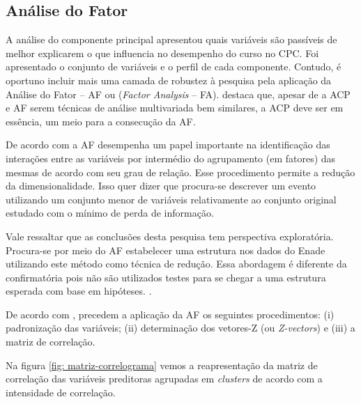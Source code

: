 \subsection{Análise do Fator}

A análise do componente principal apresentou quais variáveis são passíveis de melhor explicarem o que influencia no desempenho do curso no CPC. Foi apresentado o conjunto de variáveis e o perfil de cada componente. Contudo, é oportuno incluir mais uma camada de robustez à pesquisa pela aplicação da Análise do Fator -- AF ou (\textit{Factor Analysis} -- FA).  destaca que, apesar de a ACP e AF serem técnicas de análise multivariada bem similares, a ACP deve ser em essência, um meio para a consecução da AF. 

De acordo com  a AF desempenha um papel importante na identificação das interações entre as variáveis por intermédio do agrupamento (em fatores) das mesmas de acordo com seu grau de relação. Esse procedimento permite a redução da dimensionalidade. Isso quer dizer que procura-se descrever um evento utilizando um conjunto menor de variáveis relativamente ao conjunto original estudado com o mínimo de perda de informação.

Vale ressaltar que as conclusões desta pesquisa tem perspectiva exploratória. Procura-se por meio do AF estabelecer uma estrutura nos dados do Enade utilizando este método como técnica de redução. Essa abordagem é diferente da confirmatória pois não são utilizados testes para se chegar a uma estrutura esperada com base em hipóteses. .

De acordo com , precedem a aplicação da AF os seguintes procedimentos: (i) padronização das variáveis; (ii) determinação dos vetores-Z (ou \textit{Z-vectors}) e (iii) a matriz de correlação.

Na figura \ref{fig: matriz-correlograma} vemos a reapresentação da matriz de correlação das variáveis preditoras agrupadas em \textit{clusters} de acordo com a intensidade de correlação. 

